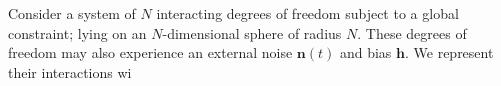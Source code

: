 Consider a system of $N$ interacting degrees of freedom subject to a global constraint; lying on an $N$-dimensional sphere of radius $N$. These degrees of freedom may also experience an external noise $\mathbf{n}(t)$ and bias $\mathbf{h}$. We represent their interactions wi